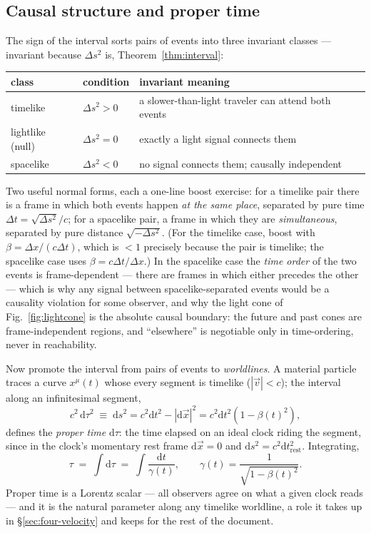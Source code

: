 \documentclass[11pt]{article}
\theoremstyle{plain}
\theoremstyle{definition}
\theoremstyle{remark}
\newcommand{\dd}{\mathrm{d}}
\newcommand{\vx}{\vec{x}}
\begin{document}
\subsection{Causal structure and proper time}
\label{sec:causal-structure}

The sign of the interval sorts pairs of events into three invariant
classes --- invariant because $\Delta s^2$ is, Theorem~\ref{thm:interval}:
\begin{center}
\begin{tabular}{lll}
\toprule
class & condition & invariant meaning \\
\midrule
timelike & $\Delta s^2 > 0$ & a slower-than-light traveler can attend both events \\
lightlike (null) & $\Delta s^2 = 0$ & exactly a light signal connects them \\
spacelike & $\Delta s^2 < 0$ & no signal connects them; causally independent \\
\bottomrule
\end{tabular}
\end{center}
Two useful normal forms, each a one-line boost exercise: for a timelike
pair there is a frame in which both events happen \emph{at the same
place}, separated by pure time
$\Delta t = \sqrt{\Delta s^2}/c$; for a spacelike pair, a frame in which
they are \emph{simultaneous}, separated by pure distance
$\sqrt{-\Delta s^2}$. (For the timelike case, boost with
$\beta = \Delta x/(c\Delta t)$, which is $< 1$ precisely because the
pair is timelike; the spacelike case uses
$\beta = c\Delta t/\Delta x$.) In the spacelike case the \emph{time
order} of the two events is frame-dependent --- there are frames in
which either precedes the other --- which is why any signal between
spacelike-separated events would be a causality violation for some
observer, and why the light cone of Fig.~\ref{fig:lightcone} is the
absolute causal boundary: the future and past cones are
frame-independent regions, and ``elsewhere'' is negotiable only in
time-ordering, never in reachability.

Now promote the interval from pairs of events to \emph{worldlines}. A
material particle traces a curve $x^\mu(t)$ whose every segment is
timelike ($|\vec v| < c$); the interval along an infinitesimal segment,
\begin{equation}
  c^2\,\dd\tau^2 \;\equiv\; \dd s^2
  = c^2\dd t^2 - |\dd\vx|^2
  = c^2\dd t^2\left(1 - \beta(t)^2\right),
\end{equation}
defines the \emph{proper time} $\dd\tau$: the time elapsed on an ideal
clock riding the segment, since in the clock's momentary rest frame
$\dd\vx = 0$ and $\dd s^2 = c^2 \dd t_{\text{rest}}^2$. Integrating,
\begin{equation}
  \boxed{\;
  \tau \;=\; \int \dd\tau
  \;=\; \int \frac{\dd t}{\gamma(t)},
  \qquad
  \gamma(t) = \frac{1}{\sqrt{1 - \beta(t)^2}} .
  \;}
  \label{eq:proper-time}
\end{equation}
Proper time is a Lorentz scalar --- all observers agree on what a given
clock reads --- and it is the natural parameter along any timelike
worldline, a role it takes up in \S\ref{sec:four-velocity} and keeps for
the rest of the document.
\end{document}
